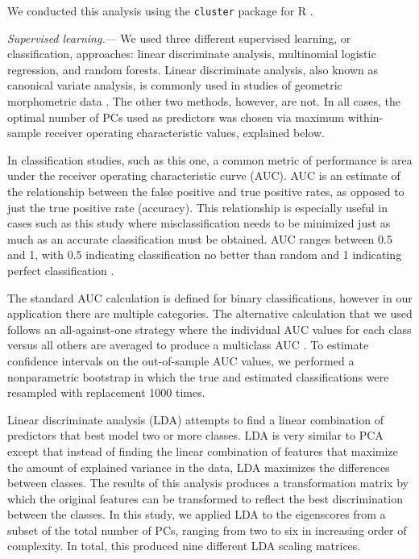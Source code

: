 \documentclass[12pt,letterpaper]{article}
\renewcommand{\subsubsection}[1]{%
\vspace{2ex}
\noindent
\textit{#1.}---}
\begin{document}
We conducted this analysis using the \texttt{cluster} package for R \citep{Maechler2013}.

\subsubsection{Supervised learning}
We used three different supervised learning, or classification, approaches: linear discriminate analysis, multinomial logistic regression, and random forests. Linear discriminate analysis, also known as canonical variate analysis, is commonly used in studies of geometric morphometric data \citep{Zelditch2004,Mitteroecker2011}. The other two methods, however, are not. In all cases, the optimal number of PCs used as predictors was chosen via maximum within-sample receiver operating characteristic values, explained below.

In classification studies, such as this one, a common metric of performance is area under the receiver operating characteristic curve (AUC). AUC is an estimate of the relationship between the false positive and true positive rates, as opposed to just the true positive rate (accuracy). This relationship is especially useful in cases such as this study where misclassification needs to be minimized just as much as an accurate classification must be obtained. AUC ranges between 0.5 and 1, with 0.5 indicating classification no better than random and 1 indicating perfect classification \citep{Hastie2009}.

The standard AUC calculation is defined for binary classifications, however in our application there are multiple categories. The alternative calculation that we used follows an all-against-one strategy where the individual AUC values for each class versus all others are averaged to produce a multiclass AUC \citep{Hand2001}. To estimate confidence intervals on the out-of-sample AUC values, we performed a nonparametric bootstrap in which the true and estimated classifications were resampled with replacement 1000 times.

Linear discriminate analysis (LDA) attempts to find a linear combination of predictors that best model two or more classes. LDA is very similar to PCA except that instead of finding the linear combination of features that maximize the amount of explained variance in the data, LDA maximizes the differences between classes. The results of this analysis produces a transformation matrix by which the original features can be transformed to reflect the best discrimination between the classes. In this study, we applied LDA to the eigenscores from a subset of the total number of PCs, ranging from two to six in increasing order of complexity. In total, this produced nine different LDA scaling matrices. 
\end{document}
